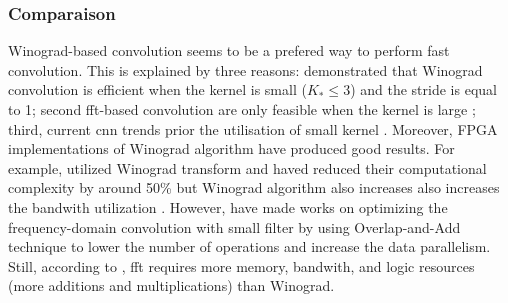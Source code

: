 \subsubsection{Comparaison}
Winograd-based convolution seems to be a prefered way to perform fast convolution. This is explained by three reasons: \textcite{lavin_fast_2015} demonstrated that Winograd convolution is efficient when the kernel is small ($K_* \leq 3$) and the stride is equal to 1; second \acrshort{fft}-based convolution are only feasible when the kernel is large \cite{ahmad_towards_2019, chitsaz_acceleration_2020}; third, current \acrshort{cnn} trends prior the utilisation of small kernel \cite{liang_evaluating_2020, sandler_mobilenetv2_2019}. \newline
Moreover, FPGA implementations of Winograd algorithm have produced good results. For example, \cite{aydonat_opencl_2017, liang_evaluating_2020} utilized Winograd transform and haved reduced their computational complexity by around 50\% but Winograd algorithm also increases also increases the bandwith utilization \cite{xiao_exploring_2017}. However, \textcite{zeng_optimizing_nodate, chitsaz_acceleration_2020, liang_evaluating_2020} have made works on optimizing the frequency-domain convolution with small filter by using Overlap-and-Add technique \cite{w_smith_scientist_1997} to lower the number of operations and increase the data parallelism. Still, according to \textcite{liang_evaluating_2020, podili_fast_2017}, \acrshort{fft} requires more memory, bandwith, and logic resources (more additions and multiplications) than Winograd.
